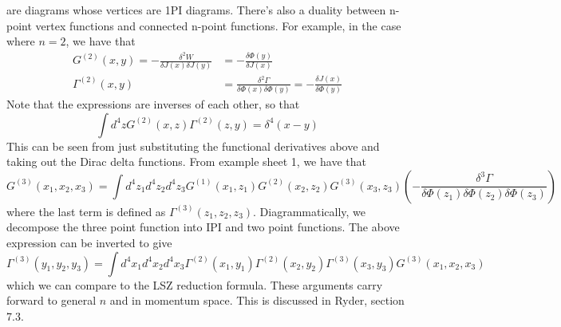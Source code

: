 \documentclass[11pt, oneside]{article}   	%
\theoremstyle{slanted}
\begin{document}
are diagrams whose vertices are 1PI diagrams.
There's also a duality between n-point vertex
functions and connected n-point functions. For example, 
in the case where $ n = 2 $, we have that 
\begin{align*}
G ^{ \left( 2  \right)  } \left( x, y  \right)   = 
- \frac{\delta ^ 2 W }{ \delta J \left( x  \right)  \delta J \left( y  \right)  } 
& = - \frac{\delta \Phi \left( y  \right)   }{ \delta J \left( x  \right)  } \\
\Gamma ^{ \left( 2  \right)  } \left( x, y  \right)  
&=  \frac{ \delta ^ 2 \Gamma  }{ \delta \Phi \left( x \right) \delta \Phi \left( y  \right)   }
=  - \frac{\delta J \left(  x  \right)  }{ \delta \Phi \left( y  \right) }
\end{align*} Note that the 
expressions are inverses 
of each other, 
so that 
\[
\int d ^ 4 z G ^{ \left( 2  \right)  } \left( x, z  \right)  
\Gamma ^{ \left( 2  \right)  } \left( z, y  \right)   = \delta ^ 4 
\left( x - y  \right) 
\] This can be seen from just substituting the 
functional derivatives above and taking 
out the Dirac delta functions. 
From example sheet 1, we have that 
\[
G ^{ \left( 3  \right) } \left( x_1, x_2, x_3  \right)  
= \int d ^ 4 z_1 d ^ 4 z_2 d ^ 4 z_3 
G ^{ \left( 1  \right)  } \left( x_1 , z_1  \right)  
G ^{ \left( 2  \right)  }\left( x_2, z_2  \right)  
G ^{ \left( 3  \right)  } \left( x_3, z_3  \right)  
\left(  - \frac{ \delta ^  3 \Gamma }{ \delta \Phi \left( z_1  \right)  
\delta \Phi \left( z_2  \right)  \delta \Phi \left( z_3  \right)   }  \right) 
\] where the last term is defined 
as $ \Gamma ^{ \left(  3  \right)   } \left( z_1, z_2, z_3   \right)  $. 
Diagrammatically, we 
decompose the three point function 
into IPI and two point functions. 
The above expression can be inverted to give 
\[
\Gamma ^{ \left( 3  \right)   } \left( 
y_1, y_2, y_3 \right)   = \int 
d ^ 4 x_1 d^ 4 x_2 d ^ 4 x_3 \Gamma ^{ \left( 2  \right)  } 
\left( x_1 , y_1  \right)  \Gamma ^{ \left( 2  \right)  } 
\left( x_2 , y_2  \right)  \Gamma ^{ \left( 3  \right)  } 
\left( x_3 , y_3  \right)  G ^{ \left( 3  \right)  } 
\left( x_1, x_2, x_3  \right) 
\] which we can compare to the LSZ reduction formula. 
These arguments carry forward to general $ n $
and in momentum space. This is 
discussed in Ryder, section 7.3. 
\end{document}
